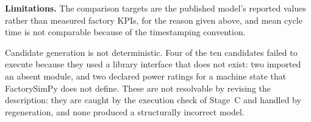 \noindent\textbf{Limitations.} The comparison targets are the published model's reported
values rather than measured factory KPIs, for the reason given above, and mean cycle time
is not comparable because of the timestamping convention.

Candidate generation is not deterministic. Four of the ten candidates failed to execute
because they used a library interface that does not exist: two imported an absent module,
and two declared power ratings for a machine state that FactorySimPy does not define.
These are not resolvable by revising the description: they are caught by the execution
check of Stage~C and handled by regeneration, and none produced a structurally incorrect
model.
